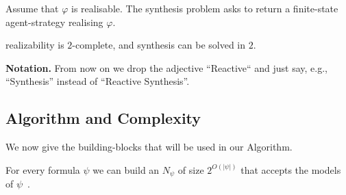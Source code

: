 \begin{definition}
 Assume that $\varphi$ is realisable. The synthesis problem asks to return a finite-state agent-strategy realising $\varphi$.
\end{definition}


\begin{theorem}\label{thm:classic}
\LTL realizability is $2$\exptime-complete, and synthesis can be solved in $2$\exptime. 
\end{theorem}

{\bf Notation.} 
From now on we drop the adjective ``Reactive`` and just say, e.g., ``\LTL Synthesis'' instead of ``\LTL Reactive Synthesis''.



\subsection{Algorithm and Complexity} \label{sec:algorithm}

We now give the building-blocks that will be used in our Algorithm.%

\begin{proposition} \label{prop:VW}
For every \LTL formula $\psi$ we can build an \NBW $N_\psi$ of size $2^{O(|\psi|)}$ that accepts the models of $\psi$~\cite{DBLP:journals/iandc/VardiW94}.  
\end{proposition}

